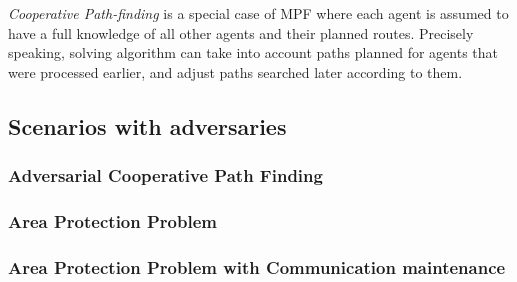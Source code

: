 \emph{Cooperative Path-finding} \cite{cpf} is a special case of MPF where each agent is
assumed to have a full knowledge of all other agents and their planned routes.
Precisely speaking, solving algorithm can take into account paths planned for
agents that were processed earlier, and adjust paths searched later according to
them.

\subsection{Scenarios with adversaries}

\subsubsection{Adversarial Cooperative Path Finding}

\subsubsection{Area Protection Problem}

\subsubsection{Area Protection Problem with Communication maintenance}

